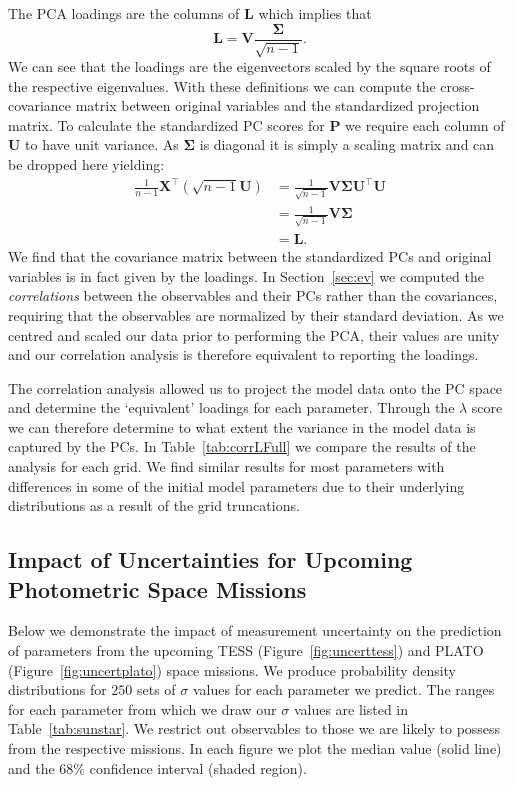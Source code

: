 The PCA loadings are the columns of \textbf{L} which implies that 
\begin{equation}
\mathbf{L}=\mathbf{V}\frac{\mathbf \Sigma}{\sqrt{n-1}}.
\end{equation}
We can see that the loadings are the eigenvectors scaled by the square roots of the respective eigenvalues.
With these definitions we can compute the cross-covariance matrix between original variables and the standardized projection matrix. 
To calculate the standardized PC scores for \textbf{P} we require each column of \textbf{U} to have unit variance. As $\mathbf{\Sigma}$ is diagonal it is simply a scaling matrix and can be dropped here yielding: 
\begin{align}
\frac{1}{n-1}\mathbf{X}^\top(\sqrt{n-1}\mathbf{U}) &=\frac{1}{\sqrt{n-1}}\mathbf{V}\mathbf{\Sigma}\mathbf{U}^\top\mathbf{U} \\&=\frac{1}{\sqrt{n-1}}\mathbf{V}\mathbf{\Sigma}
\\&=\mathbf{L}.
\end{align}
We find that the covariance matrix between the standardized PCs and original variables is in fact given by the loadings. 
In  Section~\ref{sec:ev} we computed the \emph{correlations} between the observables and their PCs rather than the covariances, requiring that the observables are normalized by their standard deviation. As we centred and scaled our data prior to performing the PCA, their values are unity and our correlation analysis is therefore equivalent to reporting the loadings. 

The correlation analysis allowed us to project the model data onto the PC space and determine the `equivalent' loadings for each parameter. Through the $\lambda$ score we can therefore determine to what extent the variance in the model data is captured by the PCs.  In Table~\ref{tab:corrLFull} we compare the results of the analysis for each grid. We find similar results for most parameters 
with differences in some of the initial model parameters due to their underlying distributions as a result of the grid truncations.




\subsection{Impact of Uncertainties for Upcoming Photometric Space Missions} 
Below we demonstrate the impact of measurement uncertainty on the prediction of parameters from the upcoming TESS (Figure~\ref{fig:uncerttess}) and PLATO (Figure~\ref{fig:uncertplato}) space missions.  We produce  probability density distributions for $250$ sets of $\sigma$ values for each parameter we predict. The ranges for each parameter from which we draw our $\sigma$ values are listed in Table~\ref{tab:sunstar}. We restrict out observables to those we are likely to possess from the respective missions. 
In each figure we plot the median value (solid line) and the  $68\%$  confidence interval (shaded region).


